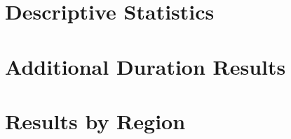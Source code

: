 \documentclass[12pt,letterpaper]{article}
\begin{document}
\clearpage
\newpage

\section{Descriptive Statistics}
\setcounter{figure}{0}
\setcounter{table}{0}




\clearpage
\newpage



\section{Additional Duration Results}

\setcounter{figure}{0}
\setcounter{table}{0}

\vspace*{-0.51cm}







\clearpage


\section{Results by Region}

\setcounter{figure}{0}
\setcounter{table}{0}

\vspace*{-0.51cm}


















\clearpage
\newpage
\end{document}
